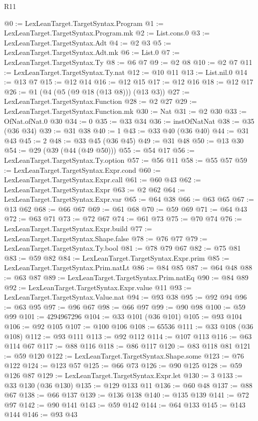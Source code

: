 \begin{lexlean}{R11}
\begin{coremodule}
@0 := LexLeanTarget.TargetSyntax.Program
@1 := LexLeanTarget.TargetSyntax.Program.mk
@2 := List.cons.{0}
@3 := LexLeanTarget.TargetSyntax.Adt
@4 := @2 @3
@5 := LexLeanTarget.TargetSyntax.Adt.mk
@6 := List.{0}
@7 := LexLeanTarget.TargetSyntax.Ty
@8 := @6 @7
@9 := @2 @8
@10 := @2 @7
@11 := LexLeanTarget.TargetSyntax.Ty.nat
@12 := @10 @11
@13 := List.nil.{0}
@14 := @13 @7
@15 := @12 @14
@16 := @12 @15
@17 := @12 @16
@18 := @12 @17
@26 := @1 (@4 (@5 (@9 @18 (@13 @8))) (@13 @3))
@27 := LexLeanTarget.TargetSyntax.Function
@28 := @2 @27
@29 := LexLeanTarget.TargetSyntax.Function.mk
@30 := Nat
@31 := @2 @30
@33 := OfNat.ofNat.{0} @30
@34 := 0
@35 := @33 @34
@36 := instOfNatNat
@38 := @35 (@36 @34)
@39 := @31 @38
@40 := 1
@43 := @33 @40 (@36 @40)
@44 := @31 @43
@45 := 2
@48 := @33 @45 (@36 @45)
@49 := @31 @48
@50 := @13 @30
@54 := @29 (@39 (@44 (@49 @50)))
@55 := @54 @17
@56 := LexLeanTarget.TargetSyntax.Ty.option
@57 := @56 @11
@58 := @55 @57
@59 := LexLeanTarget.TargetSyntax.Expr.cond
@60 := LexLeanTarget.TargetSyntax.Expr.call
@61 := @60 @43
@62 := LexLeanTarget.TargetSyntax.Expr
@63 := @2 @62
@64 := LexLeanTarget.TargetSyntax.Expr.var
@65 := @64 @38
@66 := @63 @65
@67 := @13 @62
@68 := @66 @67
@69 := @61 @68
@70 := @59 @69
@71 := @64 @43
@72 := @63 @71
@73 := @72 @67
@74 := @61 @73
@75 := @70 @74
@76 := LexLeanTarget.TargetSyntax.Expr.build
@77 := LexLeanTarget.TargetSyntax.Shape.false
@78 := @76 @77
@79 := LexLeanTarget.TargetSyntax.Ty.bool
@81 := @78 @79 @67
@82 := @75 @81
@83 := @59 @82
@84 := LexLeanTarget.TargetSyntax.Expr.prim
@85 := LexLeanTarget.TargetSyntax.Prim.natLt
@86 := @84 @85
@87 := @64 @48
@88 := @63 @87
@89 := LexLeanTarget.TargetSyntax.Prim.natEq
@90 := @84 @89
@92 := LexLeanTarget.TargetSyntax.Expr.value @11
@93 := LexLeanTarget.TargetSyntax.Value.nat
@94 := @93 @38
@95 := @92 @94
@96 := @63 @95
@97 := @96 @67
@98 := @66 @97
@99 := @90 @98
@100 := @59 @99
@101 := 4294967296
@104 := @33 @101 (@36 @101)
@105 := @93 @104
@106 := @92 @105
@107 := @100 @106
@108 := 65536
@111 := @33 @108 (@36 @108)
@112 := @93 @111
@113 := @92 @112
@114 := @107 @113
@116 := @63 @114 @67
@117 := @88 @116
@118 := @86 @117
@120 := @83 @118 @81
@121 := @59 @120
@122 := LexLeanTarget.TargetSyntax.Shape.some
@123 := @76 @122
@124 := @123 @57
@125 := @66 @73
@126 := @90 @125
@128 := @59 @126 @87
@129 := LexLeanTarget.TargetSyntax.Expr.let
@130 := 3
@133 := @33 @130 (@36 @130)
@135 := @129 @133 @11
@136 := @60 @48
@137 := @88 @67
@138 := @66 @137
@139 := @136 @138
@140 := @135 @139
@141 := @72 @97
@142 := @90 @141
@143 := @59 @142
@144 := @64 @133
@145 := @143 @144
@146 := @93 @43

\end{coremodule}
\end{lexlean}
